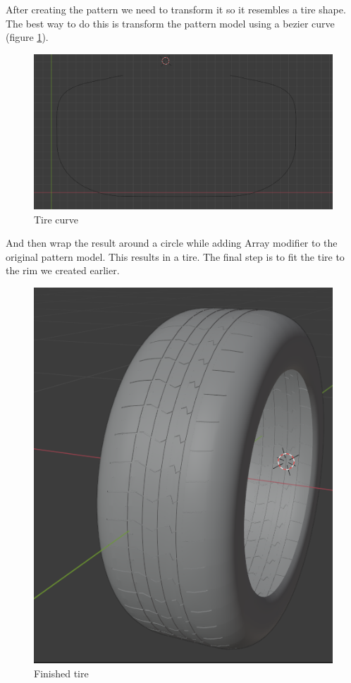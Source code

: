 \documentclass[12pt,a4paper,titlepage,final]{report}
\begin{document}
After creating the pattern we need to transform it so it resembles a tire shape. The best way to do this is transform the pattern model using a bezier curve (figure \ref{fig:tire_curve}). 
\begin{figure}[H]
    \centering
    \includegraphics{images/tire_curve.png}
    \caption{Tire curve}
    \label{fig:tire_curve}
\end{figure}
And then wrap the result around a circle while adding Array modifier to the original pattern model. This results in a tire. The final step is to fit the tire to the rim we created earlier.

\begin{figure}[H]
    \centering
    \includegraphics{images/tire_done.png}
    \caption{Finished tire}
    \label{fig:finished_tire}
\end{figure}
\end{document}
